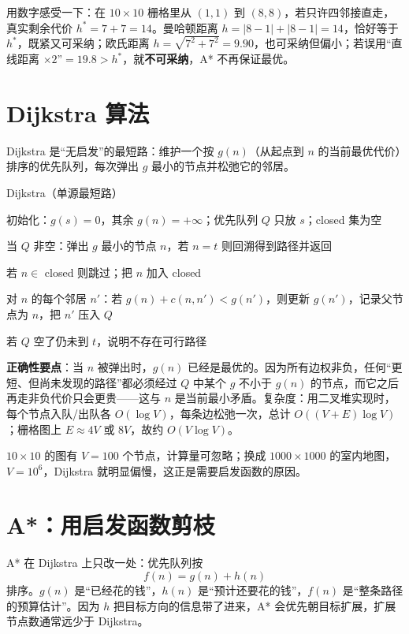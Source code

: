 用数字感受一下：在 $10\times10$ 栅格里从 $(1,1)$ 到 $(8,8)$，若只许四邻接直走，真实剩余代价 $h^*=7+7=14$。曼哈顿距离 $h=|8-1|+|8-1|=14$，恰好等于 $h^*$，既紧又可采纳；欧氏距离 $h=\sqrt{7^2+7^2}=9.90$，也可采纳但偏小；若误用“直线距离 $\times2$”$=19.8>h^*$，就\textbf{不可采纳}，A* 不再保证最优。

\section{Dijkstra 算法}\label{sec:19-dijkstra}

Dijkstra 是“无启发”的最短路：维护一个按 $g(n)$（从起点到 $n$ 的当前最优代价）排序的优先队列，每次弹出 $g$ 最小的节点并松弛它的邻居。

\begin{pseudo}{Dijkstra（单源最短路）}
  \item 初始化：$g(s)=0$，其余 $g(n)=+\infty$；优先队列 $Q$ 只放 $s$；closed 集为空
  \item 当 $Q$ 非空：弹出 $g$ 最小的节点 $n$，若 $n=t$ 则回溯得到路径并返回
  \item 若 $n\in$ closed 则跳过；把 $n$ 加入 closed
  \item 对 $n$ 的每个邻居 $n'$：若 $g(n)+c(n,n')<g(n')$，则更新 $g(n')$，记录父节点为 $n$，把 $n'$ 压入 $Q$
  \item 若 $Q$ 空了仍未到 $t$，说明不存在可行路径
\end{pseudo}

\textbf{正确性要点}：当 $n$ 被弹出时，$g(n)$ 已经是最优的。因为所有边权非负，任何“更短、但尚未发现的路径”都必须经过 $Q$ 中某个 $g$ 不小于 $g(n)$ 的节点，而它之后再走非负代价只会更贵——这与 $n$ 是当前最小矛盾。复杂度：用二叉堆实现时，每个节点入队/出队各 $O(\log V)$，每条边松弛一次，总计 $O((V+E)\log V)$；栅格图上 $E\approx4V$ 或 $8V$，故约 $O(V\log V)$。

$10\times10$ 的图有 $V=100$ 个节点，计算量可忽略；换成 $1000\times1000$ 的室内地图，$V=10^6$，Dijkstra 就明显偏慢，这正是需要启发函数的原因。

\section{A*：用启发函数剪枝}\label{sec:19-astar}

A* 在 Dijkstra 上只改一处：优先队列按
\begin{equation}
  f(n)=g(n)+h(n)
  \label{eq:19-f}
\end{equation}
排序。$g(n)$ 是“已经花的钱”，$h(n)$ 是“预计还要花的钱”，$f(n)$ 是“整条路径的预算估计”。因为 $h$ 把目标方向的信息带了进来，A* 会优先朝目标扩展，扩展节点数通常远少于 Dijkstra\cite{hart1968astar}。


